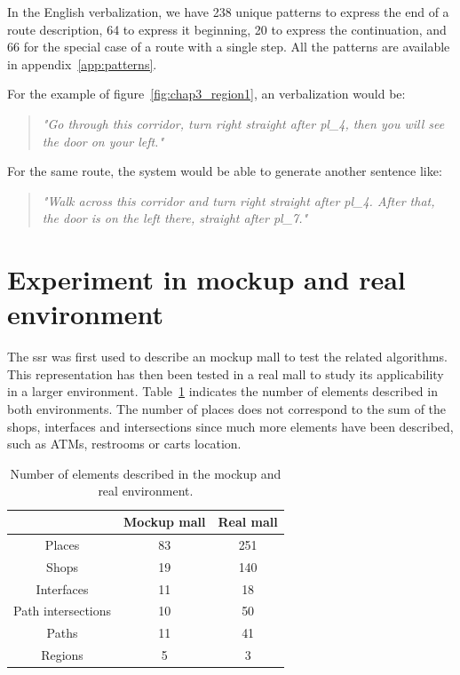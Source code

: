 In the English verbalization, we have 238 unique patterns to express the end of a route description, 64 to express it beginning, 20 to express the continuation, and 66 for the special case of a route with a single step. All the patterns are available in appendix~\ref{app:patterns}.

For the example of figure~\ref{fig:chap3_region1}, an verbalization would be:

\begin{quote} 
\centering 
\textit{
"Go through this corridor, turn right straight after pl\_4, then you will see the door on your left."}
\end{quote}

For the same route, the system would be able to generate another sentence like:

\begin{quote} 
\centering 
\textit{
"Walk across this corridor and turn right straight after pl\_4. After that, the door is on the left there, straight after pl\_7."}
\end{quote}

\section{Experiment in mockup and real environment}

The \acrshort{ssr} was first used to describe an mockup mall to test the related algorithms. This representation has then been tested in a real mall to study its applicability in a larger environment. Table~\ref{tab:chap3_count} indicates the number of elements described in both environments. The number of places does not correspond to the sum of the shops, interfaces and intersections since much more elements have been described, such as ATMs, restrooms or carts location.

\begin{table}[!h]
\begin{center}
   \begin{tabular}{ | c || c | c | }
     \hline
                        & Mockup mall & Real mall \\ \hline \hline
     Places             & 83            & 251   \\ \hline
     Shops              & 19            & 140   \\ \hline
     Interfaces         & 11            & 18    \\ \hline
     Path intersections & 10            & 50    \\ \hline
     Paths              & 11            & 41    \\ \hline
     Regions            & 5             & 3     \\
     \hline
   \end{tabular}
 \end{center}
 \caption{\label{tab:chap3_count} Number of elements described in the mockup and real environment.}
\end{table}

